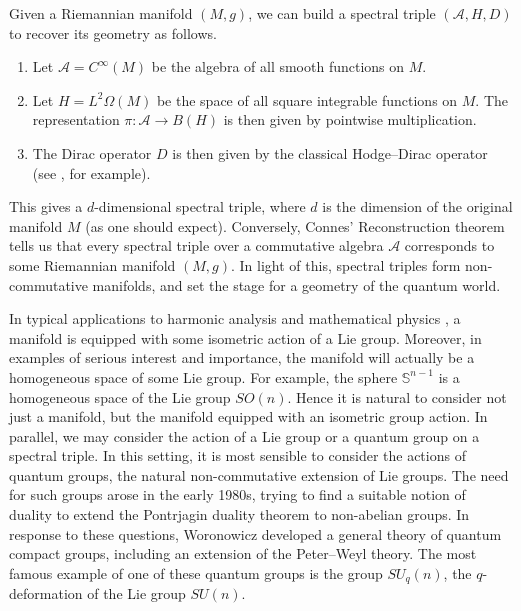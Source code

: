 \documentclass[12pt]{article}
\begin{document}
Given a Riemannian manifold $(M,g)$, we can build a spectral triple
$(\mathcal A, H, D)$ to recover its geometry as follows.
\begin{enumerate}
	\item Let $\mathcal A=C^{\infty}(M)$ be the algebra of all smooth functions
		on $M$.
	\item Let $H=L^2\Omega(M)$ be the space of all square integrable functions on
		$M$.
		The representation $\pi:\mathcal A\to B(H)$ is then given by pointwise
		multiplication.
	\item The Dirac operator $D$ is then given by the classical
		Hodge--Dirac operator (see \cite{BGV}, for example).
\end{enumerate}
This gives a $d$-dimensional spectral triple, where $d$ is the dimension of
the original manifold $M$ (as one should expect).
Conversely, Connes' Reconstruction theorem \cite{Connes-reconstruction} tells us
that every spectral triple over a commutative algebra $\mathcal A$ corresponds
to some Riemannian manifold $(M,g)$.
In light of this, spectral triples form non-commutative manifolds, and set the
stage for a geometry of the quantum world.


In typical applications to harmonic analysis \cite{helgason} and mathematical
physics \cite{c2dft}, a manifold is equipped with some isometric action of a
Lie group.
Moreover, in examples of serious interest and importance, the manifold will
actually be a homogeneous space of some Lie group.
For example, the sphere $\mathbb{S}^{n-1}$ is a homogeneous space of the
Lie group $SO(n)$.
Hence it is natural to consider not just a manifold, but the manifold equipped
with an isometric group action.
In parallel, we may consider the action of a Lie group or a quantum group on
a spectral triple.
In this setting, it is most sensible to consider the actions of quantum groups,
the natural non-commutative extension of Lie groups.
The need for such groups arose in the early 1980s, trying to find a suitable
notion of duality to extend the Pontrjagin duality theorem to non-abelian groups.
In response to these questions, Woronowicz developed a general theory of
quantum compact groups, including an extension of the Peter--Weyl theory.
The most famous example of one of these quantum groups is the group
$SU_q(n)$, the $q$-deformation of the Lie group $SU(n)$.
\end{document}
